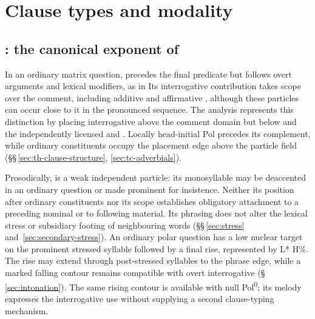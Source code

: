 \chapter{Clause types and modality}\label{ch:clause-types}

\section{: the canonical exponent of \texorpdfstring{}{Pol0}}
\label{sec:by-pol-head}

In an ordinary matrix question,  precedes the final predicate but
follows overt arguments and lexical modifiers, as in 
 Its interrogative contribution takes scope over the
comment, including additive  and affirmative , although
these particles can occur close to it in the pronounced sequence. The
analysis represents this distinction by placing interrogative
 above the comment domain but below
 and the independently licensed  and
. Locally head-initial Pol precedes its complement, while
ordinary constituents occupy the placement edge above the particle field
(§§\,\ref{sec:th-clause-structure}, \ref{sec:tc-adverbials}).

Prosodically,  is a weak independent particle: its monosyllable may
be deaccented in an ordinary question or made prominent for insistence.
Neither its position after ordinary constituents nor its scope establishes
obligatory attachment to a preceding nominal or to following material. Its
phrasing does not alter
the lexical stress or subsidiary footing of neighbouring words
(§§\,\ref{sec:stress} and~\ref{sec:secondary-stress}). An ordinary polar
question has a low nuclear target on the prominent stressed
syllable followed by a final rise, represented by L* H\%. The rise may
extend through post-stressed syllables to the phrase edge, while a marked
falling contour remains compatible with overt interrogative 
(§\,\ref{sec:intonation}). The same rising contour is available with
null Pol\textsuperscript{0}; its melody expresses the interrogative use
without supplying a second clause-typing mechanism.

